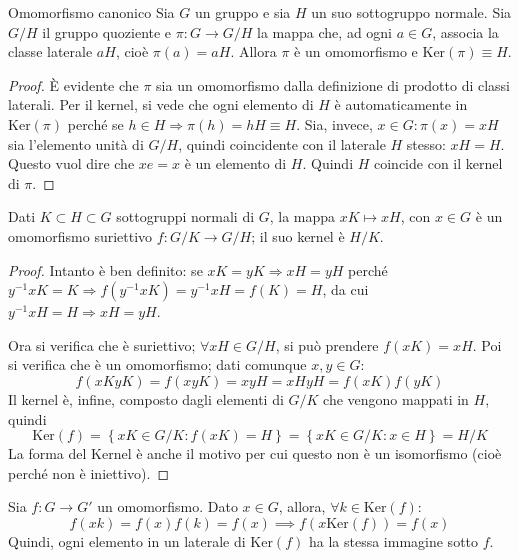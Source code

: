 \documentclass[11pt, a4paper]{scrartcl}
\theoremstyle{definition}
\numberwithin{esempio}{section}
\theoremstyle{definition}
\numberwithin{obs}{section}
\numberwithin{nota}{section}
\numberwithin{equation}{subsection}
\begin{document}
\begin{corollario}
	{Omomorfismo canonico}{}
	Sia $G$ un gruppo e sia $H$ un suo sottogruppo normale. 
	Sia $G / H$ il gruppo quoziente e $\pi:G\to G /H$ la mappa che, ad ogni $a\in G$, associa la classe laterale $aH$, cio\`e $\pi(a) = aH$. Allora $\pi$ \`e un omomorfismo e $\mathrm{Ker} (\pi) \equiv H$.
	\begin{proof}
	\`E evidente che $\pi$ sia un omomorfismo dalla definizione di prodotto di classi laterali.
	Per il kernel, si vede che ogni elemento di $H$ \`e automaticamente in $\mathrm{Ker} (\pi)$ perch\'e se $h \in H \Rightarrow  \pi(h) = hH \equiv H$.
Sia, invece, $x \in G:\pi(x) = xH $ sia l'elemento unit\`a di $G/H$, quindi coincidente con il laterale $H$ stesso: $xH = H$.
Questo vuol dire che $xe = x$ \`e un elemento di $H$. Quindi $H$ coincide con il kernel di $\pi$.
	\end{proof}
\end{corollario}
\begin{prop}
	{}{}
Dati $K \subset H \subset G$ sottogruppi normali di $G$, la mappa $xK \mapsto xH$, con $x \in G$ \`e un omomorfismo suriettivo $f: G / K \to G / H$; il suo kernel \`e $H / K$.
\begin{proof}
	Intanto \`e ben definito: se $xK = yK \Rightarrow xH = yH$ perch\'e $y^{-1} x K = K \Rightarrow  f(y^{-1} xK)= y^{-1} x H = f(K) = H$, da cui $y^{-1} x H = H \Rightarrow xH = yH$.

	Ora si verifica che \`e suriettivo; $\forall xH \in G / H$, si pu\`o prendere $f(xK) = xH$.
	Poi si verifica che \`e un omomorfismo; dati comunque $x,y \in G$:
	\[
	f(xK yK) = f(xyK) = xy H = xHyH = f(xK)f(yK)
	\] 
Il kernel \`e, infine, composto dagli elementi di $G / K$ che vengono mappati in $H$, quindi 
\[
\mathrm{Ker} (f) = \left\{ xK \in G / K : f(xK) = H\right\} = \left\{ xK \in G / K : x \in H \right\} =  H / K 
\] 
La forma del Kernel \`e anche il motivo per cui questo non \`e un isomorfismo (cio\`e perch\'e non \`e iniettivo).
\end{proof}
\end{prop}
\noindent Sia $f:G\to G'$ un omomorfismo. Dato $x \in G$, allora, $\forall k \in \mathrm{Ker} (f)$:
\[
	f(xk) = f(x) f(k) = f(x) \implies f(x\mathrm{Ker} (f)) = f(x)
\] 
Quindi, ogni elemento in un laterale di $\mathrm{Ker} (f)$ ha la stessa immagine sotto $f$.
\end{document}
